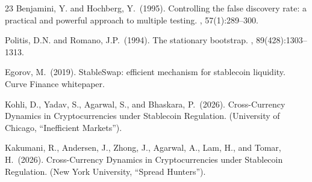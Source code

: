 \documentclass[sigconf,anonymous,natbib=false]{acmart}
\begin{document}
\begin{thebibliography}{23}
Benjamini, Y. and Hochberg, Y.\ (1995).
\newblock Controlling the false discovery rate: a practical and powerful approach to multiple
  testing.
, 57(1):289--300.

Politis, D.N. and Romano, J.P.\ (1994).
\newblock The stationary bootstrap.
, 89(428):1303--1313.

Egorov, M.\ (2019).
\newblock StableSwap: efficient mechanism for stablecoin liquidity.
\newblock Curve Finance whitepaper.

Kohli, D., Yadav, S., Agarwal, S., and Bhaskara, P.\ (2026).
\newblock Cross-Currency Dynamics in Cryptocurrencies under Stablecoin Regulation.
 (University of Chicago, ``Inefficient Markets'').

Kakumani, R., Andersen, J., Zhong, J., Agarwal, A., Lam, H., and Tomar, H.\ (2026).
\newblock Cross-Currency Dynamics in Cryptocurrencies under Stablecoin Regulation.
 (New York University, ``Spread Hunters'').

\end{thebibliography}
\end{document}
